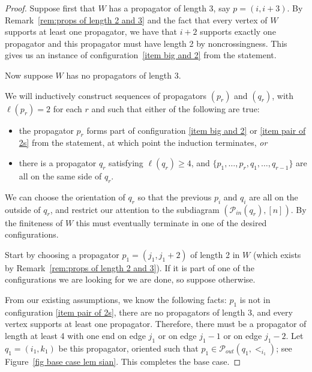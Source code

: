 \documentclass[11pt]{article}
\newcommand{\cP}{\mathcal{P}}
\theoremstyle{remark}
\theoremstyle{definition}
\begin{document}
\begin{proof}
Suppose first that $W$ has a propagator of length $3$, say $p=(i, i+3)$.  By Remark~\ref{rem:props of length 2 and 3} and the fact that every vertex of $W$ supports at least one propagator, we have that $i+2$ supports exactly one propagator and this propagator must have length 2 by noncrossingness.  This gives us an instance of configuration~\ref{item big and 2} from the statement.

Now suppose $W$ has no propagators of length $3$.
  
We will inductively construct sequences of propagators $(p_r)$ and $(q_r)$, with $\ell(p_r) = 2$ for each $r$ and such that either of the following are true:
\begin{itemize}
\item the propagator $p_r$ forms part of configuration \ref{item big and 2} or \ref{item pair of 2s} from the statement, at which point the induction terminates, 
{\em or} 
\item there is a propagator $q_r$ satisfying $\ell(q_r) \geq 4$, and $\{p_1, \ldots, p_r, q_1, \ldots, q_{r-1}\}$ are all on the same side of $q_r$.  
\end{itemize}

We can choose the orientation of $q_r$ so that the previous $p_i$ and $q_i$ are all on the outside of $q_r$, and restrict our attention to the subdiagram $(\cP_{in}(q_r),[n])$. By the finiteness of $W$ this must eventually terminate in one of the desired configurations. %


Start by choosing a propagator $p_1 = (j_1,j_1+2)$ of length 2 in $W$ (which exists by Remark~\ref{rem:props of length 2 and 3}).  If it is part of one of the configurations we are looking for we are done, 
so suppose otherwise. 

From our existing assumptions, we know the following facts: $p_1$ is not in configuration \ref{item pair of 2s}, there are no propagators of length $3$, and every vertex supports at least one propagator.  Therefore, there must be a propagator of length at least 4 with one end on edge $j_1$ or on edge $j_1-1$ or on edge $j_1-2$.  Let $q_1 = (i_1, k_1)$ be this propagator, oriented such that $p_1 \in \cP_{out}(q_1,<_{i_1})$; see Figure~\ref{fig base case lem sian}. This completes the base case.


\end{proof}
\end{document}
